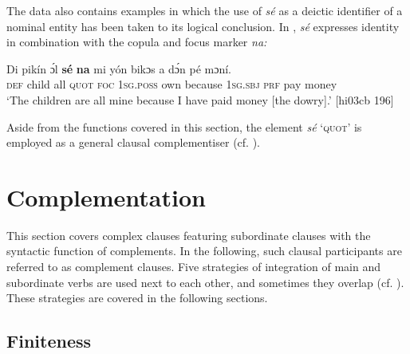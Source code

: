 \ea%
    \label{ex:key:1379}
\z\z

The data also contains examples in which the use of \textit{sé} as a deictic identifier of a nominal entity has been taken to its logical conclusion. In , \textit{sé} expresses identity in combination with the copula and focus marker \textit{na:}


\ea%
    \label{ex:key:1380}
    \gll Di  pikín  ɔ́l  \textbf{sé}    \textbf{na} mi    yón   
bikɔs  a    dɔ́n  pé  mɔní.\\
    \textsc{def}  child  all  \textsc{quot}    \textsc{foc}  \textsc{1sg.poss}  own  
because  \textsc{1sg.sbj}  \textsc{prf}  pay  money\\

\glt ‘The children are all mine because I have paid money 
[the dowry].’ [hi03cb 196]
\z

Aside from the functions covered in this section, the element \textit{sé} ‘\textsc{quot}’ is employed as a general clausal complementiser (cf. ). 

\section{Complementation}\label{sec:10.5}

This section covers complex clauses featuring subordinate clauses with the syntactic function of complements. In the following, such clausal participants are referred to as complement clauses. Five strategies of integration of main and subordinate verbs are used next to each other, and sometimes they overlap (cf. ). These strategies are covered in the following sections. 

\subsection{Finiteness}\label{sec:10.5.1}

